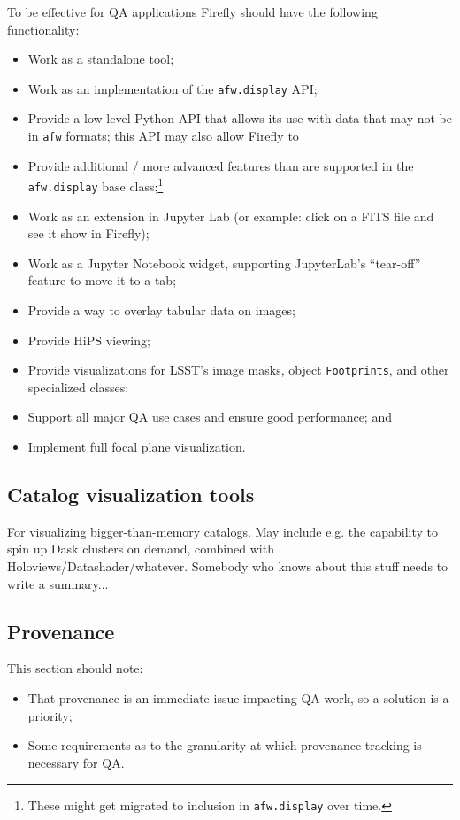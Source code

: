 \documentclass[DM,authoryear,toc,lsstdraft]{lsstdoc}
\begin{document}
To be effective for QA applications Firefly should have the following functionality:
\begin{itemize}
  \item{Work as a standalone tool;}
  \item{Work as an implementation of the \verb|afw.display| API;}
  \item{Provide a low-level Python API that allows its use with data that may not be in \verb|afw| formats; this API may also allow Firefly to}
  \item{Provide additional / more advanced features than are supported in the \verb|afw.display| base class;\footnote{These might get migrated to inclusion in \verb|afw.display| over time.}}
  \item{Work as an extension in Jupyter Lab (or example: click on a FITS file and see it show in Firefly);}
  \item{Work as a Jupyter Notebook widget, supporting JupyterLab's ``tear-off'' feature to move it to a tab;}
  \item{Provide a way to overlay tabular data on images;}
  \item{Provide HiPS viewing;}
  \item{Provide visualizations for LSST's image masks, object \verb|Footprints|, and other specialized classes;}
  \item{Support all major QA use cases and ensure good performance; and}
  \item{Implement full focal plane visualization.}
\end{itemize}



\subsection{Catalog visualization tools}


For visualizing bigger-than-memory catalogs. May include e.g. the capability
to spin up Dask clusters on demand, combined with
Holoviews/Datashader/whatever. Somebody who knows about this stuff needs to
write a summary...

\subsection{Provenance}


This section should note:

\begin{itemize}

  \item{That provenance is an immediate issue impacting QA work, so a solution
  is a priority;}

  \item{Some requirements as to the granularity at which provenance tracking
  is necessary for QA.}

\end{itemize}

\appendix
\glsaddall
\printglossary[style=index]


\end{document}
